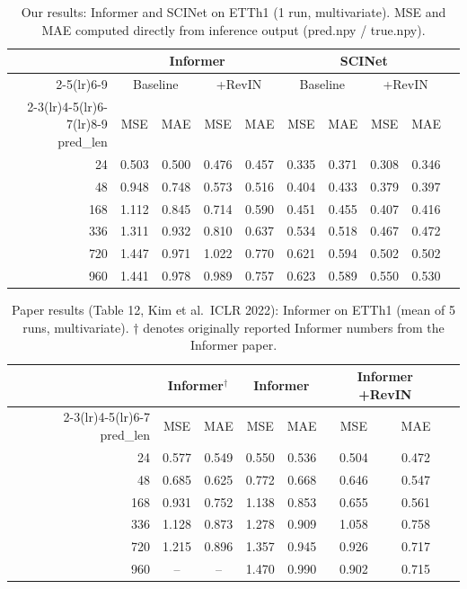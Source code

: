 \documentclass{article}
\begin{document}
\begin{table}[h]
\centering
\caption{Our results: Informer and SCINet on ETTh1 (1 run, multivariate). MSE and MAE
computed directly from inference output (pred.npy / true.npy).}
\begin{tabular}{rccccccccc}
\toprule
& \multicolumn{4}{c}{Informer} & \multicolumn{4}{c}{SCINet} \\
\cmidrule(lr){2-5}\cmidrule(lr){6-9}
& \multicolumn{2}{c}{Baseline} & \multicolumn{2}{c}{+RevIN} & \multicolumn{2}{c}{Baseline} & \multicolumn{2}{c}{+RevIN} \\
\cmidrule(lr){2-3}\cmidrule(lr){4-5}\cmidrule(lr){6-7}\cmidrule(lr){8-9}
pred\_len & MSE & MAE & MSE & MAE & MSE & MAE & MSE & MAE \\
\midrule
24  & 0.503 & 0.500 & 0.476 & 0.457 & 0.335 & 0.371 & 0.308 & 0.346 \\
48  & 0.948 & 0.748 & 0.573 & 0.516 & 0.404 & 0.433 & 0.379 & 0.397 \\
168 & 1.112 & 0.845 & 0.714 & 0.590 & 0.451 & 0.455 & 0.407 & 0.416 \\
336 & 1.311 & 0.932 & 0.810 & 0.637 & 0.534 & 0.518 & 0.467 & 0.472 \\
720 & 1.447 & 0.971 & 1.022 & 0.770 & 0.621 & 0.594 & 0.502 & 0.502 \\
960 & 1.441 & 0.978 & 0.989 & 0.757 & 0.623 & 0.589 & 0.550 & 0.530 \\
\bottomrule
\end{tabular}
\end{table}

\begin{table}[h]
\centering
\caption{Paper results (Table 12, Kim et al.\ ICLR 2022): Informer on ETTh1
(mean of 5 runs, multivariate). $\dagger$ denotes originally reported Informer
numbers from the Informer paper.}
\begin{tabular}{rccccccc}
\toprule
& \multicolumn{2}{c}{Informer$^\dagger$} & \multicolumn{2}{c}{Informer} & \multicolumn{2}{c}{Informer +RevIN} \\
\cmidrule(lr){2-3}\cmidrule(lr){4-5}\cmidrule(lr){6-7}
pred\_len & MSE & MAE & MSE & MAE & MSE & MAE \\
\midrule
24  & 0.577 & 0.549 & 0.550 & 0.536 & 0.504 & 0.472 \\
48  & 0.685 & 0.625 & 0.772 & 0.668 & 0.646 & 0.547 \\
168 & 0.931 & 0.752 & 1.138 & 0.853 & 0.655 & 0.561 \\
336 & 1.128 & 0.873 & 1.278 & 0.909 & 1.058 & 0.758 \\
720 & 1.215 & 0.896 & 1.357 & 0.945 & 0.926 & 0.717 \\
960 & --    & --    & 1.470 & 0.990 & 0.902 & 0.715 \\
\bottomrule
\end{tabular}
\end{table}
\end{document}
